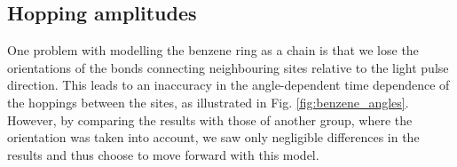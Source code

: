 \subsection{Hopping amplitudes}
One problem with modelling the benzene ring as a chain is that we lose the orientations of the bonds connecting neighbouring sites relative to the light pulse direction.
This leads to an inaccuracy in the angle-dependent time dependence of the hoppings between the sites, as illustrated in Fig. \ref{fig:benzene_angles}. However, by comparing the results with those of another group, where the orientation was taken into account, we saw only negligible differences in the results and thus choose to move forward with this model.
    
